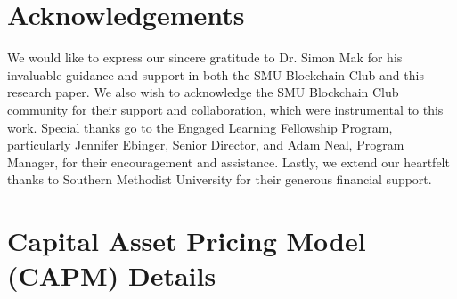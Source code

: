 \documentclass{ledger}
\begin{document}
\section*{Acknowledgements} 

We would like to express our sincere gratitude to Dr. Simon Mak for his invaluable guidance and support in both the SMU Blockchain Club and this research paper. We also wish to acknowledge the SMU Blockchain Club community for their support and collaboration, which were instrumental to this work. Special thanks go to the Engaged Learning Fellowship Program, particularly Jennifer Ebinger, Senior Director, and Adam Neal, Program Manager, for their encouragement and assistance. Lastly, we extend our heartfelt thanks to Southern Methodist University for their generous financial support.







\newpage 	

\appendix
\setcounter{section}{0}
\section{Capital Asset Pricing Model (CAPM) Details}\label{appendix:capm_details}
\end{document}
